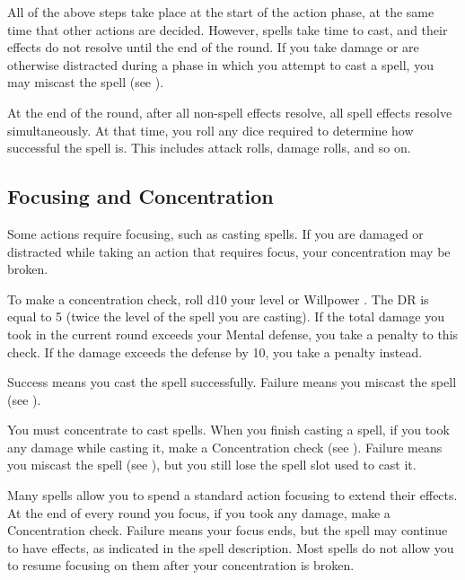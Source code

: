        All of the above steps take place at the start of the action phase, at the same time that other actions are decided.
        However, spells take time to cast, and their effects do not resolve until the end of the round.
        If you take damage or are otherwise distracted during a phase in which you attempt to cast a spell, you may miscast the spell (see ).

        At the end of the round, after all non-spell effects resolve, all spell effects resolve simultaneously.
        At that time, you roll any dice required to determine how successful the spell is.
        This includes attack rolls, damage rolls, and so on.

    \subsection{Focusing and Concentration}\label{Concentration}\label{Focus}\label{Focusing and Concentration}

        Some actions require focusing, such as casting spells.
        If you are damaged or distracted while taking an action that requires focus, your concentration may be broken.

        \label{Concentration Checks}

        To make a concentration check, roll d10 \add your level or Willpower \sub {}.
        The DR is equal to 5 \add (twice the level of the spell you are casting).
        If the total damage you took in the current round exceeds your Mental defense, you take a  penalty to this check.
        If the damage exceeds the defense by 10, you take a  penalty instead.

        Success means you cast the spell successfully.
        Failure means you miscast the spell (see ).

         You must concentrate to cast spells.
        When you finish casting a spell, if you took any damage while casting it, make a Concentration check (see ). Failure means you miscast the spell (see ), but you still lose the spell slot used to cast it.

         Many spells allow you to spend a standard action focusing to extend their effects.
        At the end of every round you focus, if you took any damage, make a Concentration check.
        Failure means your focus ends, but the spell may continue to have effects, as indicated in the spell description.
        Most spells do not allow you to resume focusing on them after your concentration is broken.

